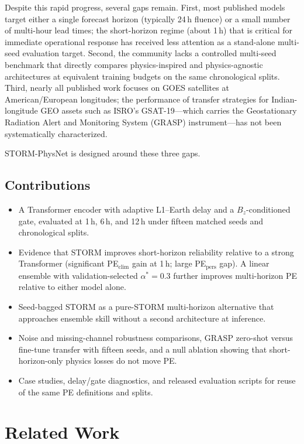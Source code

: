 \documentclass{ieeeaccess}
\begin{document}
Despite this rapid progress, several gaps remain. First, most published models
target either a single forecast horizon (typically 24\,h fluence) or a small
number of multi-hour lead times; the short-horizon regime (about 1\,h) that
is critical for immediate operational response has received less attention as a
stand-alone multi-seed evaluation target. Second, the community lacks a
controlled multi-seed benchmark that directly compares physics-inspired and
physics-agnostic architectures at equivalent training budgets on the same
chronological splits. Third, nearly all published work focuses on GOES satellites
at American/European longitudes; the performance of transfer strategies for
Indian-longitude GEO assets such as ISRO's GSAT-19---which carries the
Geostationary Radiation Alert and Monitoring System (GRASP) instrument---has not
been systematically characterized.

STORM-PhysNet is designed around these three gaps.

\subsection{Contributions}
\begin{itemize}
\item A Transformer encoder with adaptive L1--Earth delay and a
\(B_z\)-conditioned gate, evaluated at 1\,h, 6\,h, and 12\,h under
fifteen matched seeds and chronological splits.
\item Evidence that STORM improves short-horizon reliability relative to
a strong Transformer (significant PE\(_{\mathrm{clim}}\) gain at 1\,h;
large PE\(_{\mathrm{pers}}\) gap). A linear ensemble with
validation-selected \(\alpha^*=0.3\) further improves multi-horizon PE
relative to either model alone.
\item Seed-bagged STORM as a pure-STORM multi-horizon alternative that
approaches ensemble skill without a second architecture at inference.
\item Noise and missing-channel robustness comparisons, GRASP
zero-shot versus fine-tune transfer with fifteen seeds, and a null
ablation showing that short-horizon-only physics losses do not move PE.
\item Case studies, delay/gate diagnostics, and released evaluation
scripts for reuse of the same PE definitions and splits.
\end{itemize}


\section{Related Work}
\label{sec:related}
\end{document}
